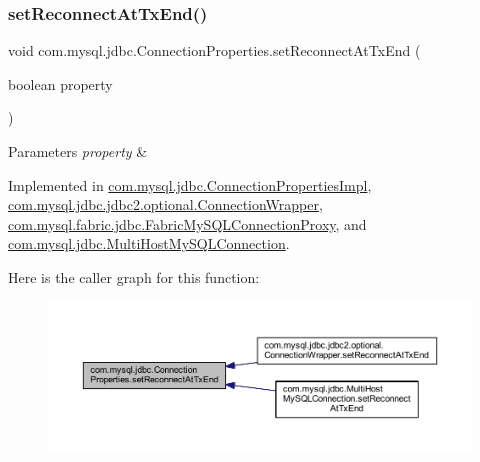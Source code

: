\subsubsection{\texorpdfstring{set\+Reconnect\+At\+Tx\+End()}{setReconnectAtTxEnd()}}
{\footnotesize\ttfamily void com.\+mysql.\+jdbc.\+Connection\+Properties.\+set\+Reconnect\+At\+Tx\+End (\begin{DoxyParamCaption}\item[{boolean}]{property }\end{DoxyParamCaption})}


\begin{DoxyParams}{Parameters}
{\em property} & \\
\hline
\end{DoxyParams}


Implemented in \mbox{\hyperlink{classcom_1_1mysql_1_1jdbc_1_1_connection_properties_impl_a1f0ec176f93a55470c982b5b89699e03}{com.\+mysql.\+jdbc.\+Connection\+Properties\+Impl}}, \mbox{\hyperlink{classcom_1_1mysql_1_1jdbc_1_1jdbc2_1_1optional_1_1_connection_wrapper_a54004b1b90728b482c4bb555a76dbb29}{com.\+mysql.\+jdbc.\+jdbc2.\+optional.\+Connection\+Wrapper}}, \mbox{\hyperlink{classcom_1_1mysql_1_1fabric_1_1jdbc_1_1_fabric_my_s_q_l_connection_proxy_a153cc93828f12582dd13b0ec5e44f5ec}{com.\+mysql.\+fabric.\+jdbc.\+Fabric\+My\+S\+Q\+L\+Connection\+Proxy}}, and \mbox{\hyperlink{classcom_1_1mysql_1_1jdbc_1_1_multi_host_my_s_q_l_connection_aee7c83d3df1213baf1db90fa072c6262}{com.\+mysql.\+jdbc.\+Multi\+Host\+My\+S\+Q\+L\+Connection}}.

Here is the caller graph for this function\+:\nopagebreak
\begin{figure}[H]
\begin{center}
\leavevmode
\includegraphics[width=350pt]{interfacecom_1_1mysql_1_1jdbc_1_1_connection_properties_a60491800609ee12f89f5545a9e26db4c_icgraph}
\end{center}
\end{figure}
\mbox{\label{interfacecom_1_1mysql_1_1jdbc_1_1_connection_properties_a2b1a30e309c80866f41d0bc85d16e958}} 
